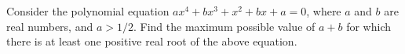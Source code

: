 Consider the polynomial equation $ax^4 + bx^3 + x^2 + bx + a = 0$, where $a$
and $b$ are real numbers, and $a > 1/2$. Find the maximum possible value of
$a + b$ for which there is at least one positive real root of the above equation.
